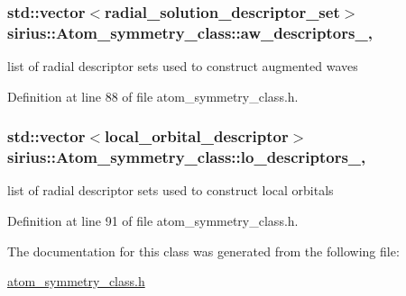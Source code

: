 \subsubsection[{aw\+\_\+descriptors\+\_\+}]{\setlength{\rightskip}{0pt plus 5cm}std\+::vector$<${\bf radial\+\_\+solution\+\_\+descriptor\+\_\+set}$>$ sirius\+::\+Atom\+\_\+symmetry\+\_\+class\+::aw\+\_\+descriptors\+\_\+\hspace{0.3cm}{\ttfamily [mutable]}, {\ttfamily [private]}}\label{classsirius_1_1_atom__symmetry__class_abfda6d0f0e8fdf62ace1b2d398b22e74}


list of radial descriptor sets used to construct augmented waves 



Definition at line 88 of file atom\+\_\+symmetry\+\_\+class.\+h.

\hypertarget{classsirius_1_1_atom__symmetry__class_a28d09903836c52e4b0fc322776b3aab8}{}
\subsubsection[{lo\+\_\+descriptors\+\_\+}]{\setlength{\rightskip}{0pt plus 5cm}std\+::vector$<${\bf local\+\_\+orbital\+\_\+descriptor}$>$ sirius\+::\+Atom\+\_\+symmetry\+\_\+class\+::lo\+\_\+descriptors\+\_\+\hspace{0.3cm}{\ttfamily [mutable]}, {\ttfamily [private]}}\label{classsirius_1_1_atom__symmetry__class_a28d09903836c52e4b0fc322776b3aab8}


list of radial descriptor sets used to construct local orbitals 



Definition at line 91 of file atom\+\_\+symmetry\+\_\+class.\+h.



The documentation for this class was generated from the following file\+:\begin{DoxyCompactItemize}
\item 
\hyperlink{atom__symmetry__class_8h}{atom\+\_\+symmetry\+\_\+class.\+h}\end{DoxyCompactItemize}
